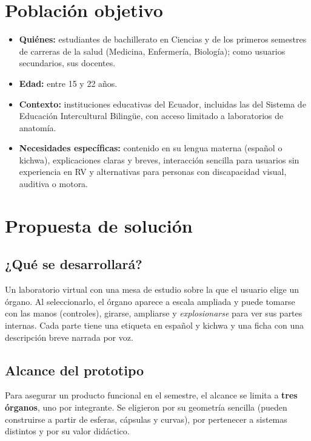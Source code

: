 \documentclass[11pt,a4paper]{article}
\begin{document}
\section{Población objetivo}
\begin{itemize}
    \item \textbf{Quiénes:} estudiantes de bachillerato en Ciencias y de los primeros semestres de carreras de la salud (Medicina, Enfermería, Biología); como usuarios secundarios, sus docentes.
    \item \textbf{Edad:} entre 15 y 22 años.
    \item \textbf{Contexto:} instituciones educativas del Ecuador, incluidas las del Sistema de Educación Intercultural Bilingüe, con acceso limitado a laboratorios de anatomía.
    \item \textbf{Necesidades específicas:} contenido en su lengua materna (español o kichwa), explicaciones claras y breves, interacción sencilla para usuarios sin experiencia en RV y alternativas para personas con discapacidad visual, auditiva o motora.
\end{itemize}

\section{Propuesta de solución}
\subsection{¿Qué se desarrollará?}
Un laboratorio virtual con una mesa de estudio sobre la que el usuario elige un órgano. Al seleccionarlo, el órgano aparece a escala ampliada y puede tomarse con las manos (controles), girarse, ampliarse y \emph{explosionarse} para ver sus partes internas. Cada parte tiene una etiqueta en español y kichwa y una ficha con una descripción breve narrada por voz.

\subsection{Alcance del prototipo}
Para asegurar un producto funcional en el semestre, el alcance se limita a \textbf{tres órganos}, uno por integrante. Se eligieron por su geometría sencilla (pueden construirse a partir de esferas, cápsulas y curvas), por pertenecer a sistemas distintos y por su valor didáctico.
\end{document}
